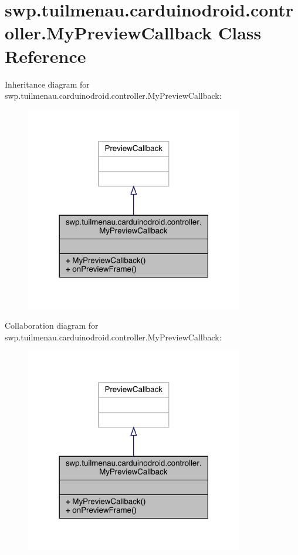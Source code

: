\hypertarget{classswp_1_1tuilmenau_1_1carduinodroid_1_1controller_1_1_my_preview_callback}{}\section{swp.\+tuilmenau.\+carduinodroid.\+controller.\+My\+Preview\+Callback Class Reference}
\label{classswp_1_1tuilmenau_1_1carduinodroid_1_1controller_1_1_my_preview_callback}


Inheritance diagram for swp.\+tuilmenau.\+carduinodroid.\+controller.\+My\+Preview\+Callback\+:
\nopagebreak
\begin{figure}[H]
\begin{center}
\leavevmode
\includegraphics[width=270pt]{classswp_1_1tuilmenau_1_1carduinodroid_1_1controller_1_1_my_preview_callback__inherit__graph}
\end{center}
\end{figure}


Collaboration diagram for swp.\+tuilmenau.\+carduinodroid.\+controller.\+My\+Preview\+Callback\+:
\nopagebreak
\begin{figure}[H]
\begin{center}
\leavevmode
\includegraphics[width=270pt]{classswp_1_1tuilmenau_1_1carduinodroid_1_1controller_1_1_my_preview_callback__coll__graph}
\end{center}
\end{figure}
